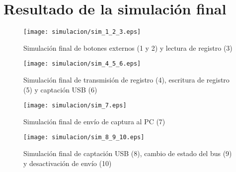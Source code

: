 \chapter{Resultado de la simulación final}
\label{ch:simulacion-final}

\begin{figure}[htbp]
    \centering
    \texttt{[image: simulacion/sim\_1\_2\_3.eps]}
    \caption{Simulación final de botones externos (1 y 2) y lectura de registro (3)}
    \label{fig:simulacion_1_2_3}
\end{figure}

\begin{figure}[htbp]
    \centering
    \texttt{[image: simulacion/sim\_4\_5\_6.eps]}
    \caption{Simulación final de transmisión de registro (4), escritura de registro (5) y captación USB (6)}
    \label{fig:simulacion_4_5_6}
\end{figure}

\begin{figure}[htbp]
    \centering
    \texttt{[image: simulacion/sim\_7.eps]}
    \caption{Simulación final de envío de captura al PC (7)}
    \label{fig:simulacion_7}
\end{figure}

\begin{figure}[htbp]
    \centering
    \texttt{[image: simulacion/sim\_8\_9\_10.eps]}
    \caption{Simulación final de captación USB (8), cambio de estado del bus (9) y desactivación de envío (10)}
    \label{fig:simulacion_8_9_10}
\end{figure}
